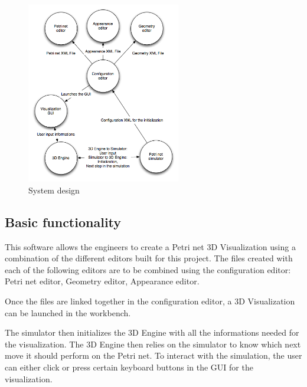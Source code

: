 \begin{figure}[htp]
\begin{center}
  \includegraphics[width=0.6\textwidth]{image/system_design.png}
  \caption{System design}
  \label{fig:system_diagram}
\end{center}
\end{figure}

\subsection{Basic functionality}


This software allows the engineers to create a Petri net 3D Visualization using a combination of the different editors built for this project.
The files created with each of the following editors are to be combined using the configuration editor: \newline
Petri net editor, Geometry editor, Appearance editor. 

Once the files are linked together in the configuration editor, a 3D Visualization can be launched in the workbench. \newline

The simulator then initializes the 3D Engine with all the informations needed for the visualization. The 3D Engine then relies on the simulator to know which next move it should perform on the Petri net. \newline
To interact with the simulation, the user can either click or press certain keyboard buttons in the GUI for the visualization. \newline



